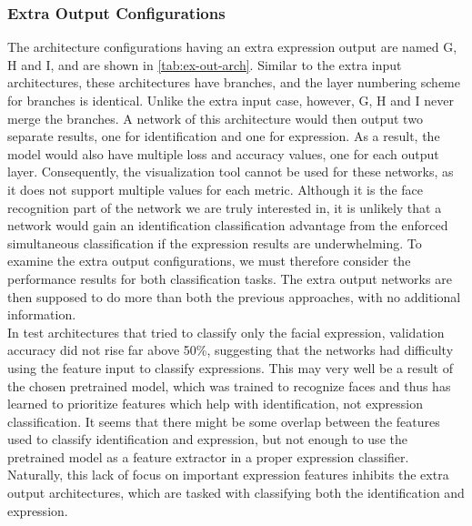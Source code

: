 \subsubsection{Extra Output Configurations}

The architecture configurations having an extra expression output are named G, H and I, and are shown in \autoref{tab:ex-out-arch}. Similar to the extra input architectures, these architectures have branches, and the layer numbering scheme for branches is identical. Unlike the extra input case, however, G, H and I never merge the branches. A network of this architecture would then output two separate results, one for identification and one for expression. As a result, the model would also have multiple loss and accuracy values, one for each output layer. Consequently, the visualization tool cannot be used for these networks, as it does not support multiple values for each metric. Although it is the face recognition part of the network we are truly interested in, it is unlikely that a network would gain an identification classification advantage from the enforced simultaneous classification if the expression results are underwhelming. To examine the extra output configurations, we must therefore consider the performance results for both classification tasks. The extra output networks are then supposed to do more than both the previous approaches, with no additional information. \\

\noindent In test architectures that tried to classify only the facial expression, validation accuracy did not rise far above 50\%, suggesting that the networks had difficulty using the feature input to classify expressions. This may very well be a result of the chosen pretrained model, which was trained to recognize faces and thus has learned to prioritize features which help with identification, not expression classification. It seems that there might be some overlap between the features used to classify identification and expression, but not enough to use the pretrained model as a feature extractor in a proper expression classifier. Naturally, this lack of focus on important expression features inhibits the extra output architectures, which are tasked with classifying both the identification and expression. \\

